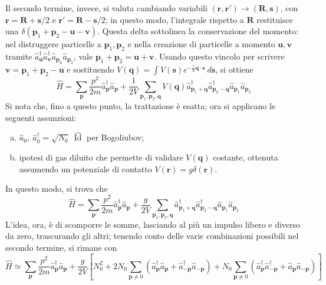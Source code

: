 \documentclass[11pt, a4paper]{scrartcl}
\theoremstyle{style}
\theoremstyle{style1}
\numberwithin{equation}{subsection}
\begin{document}
Il secondo termine, invece, si valuta cambiando variabili $(\mathbf{r} ,\mathbf{r} ') \to (\mathbf{R} ,\mathbf{s} )$, con $\mathbf{r} = \mathbf{R}  + \mathbf{s} /2$ e $\mathbf{r} ' = \mathbf{R} - \mathbf{s} /2$; in questo modo, l'integrale rispetto a $\mathbf{R} $ restituisce una $\delta \left(\mathbf{p} _1 + \mathbf{p} _2 - \mathbf{u} - \mathbf{v} \right) $.
Questa delta sottolinea la conservazione del momento: nel distruggere particelle a $\mathbf{p} _1, \mathbf{p} _2$ e nella creazione di particelle a momento $\mathbf{u} ,\mathbf{v} $ tramite $\hat{a}_\mathbf{u} ^\dagger \hat{a}^\dagger _\mathbf{v} \hat{a}_{\mathbf{p_1} } \hat{a}_{\mathbf{p} _2} $, vale $\mathbf{p} _1 +\mathbf{p} _2 = \mathbf{u} + \mathbf{v} $.
Usando questo vincolo per scrivere $\mathbf{v}  = \mathbf{p} _1 + \mathbf{p} _2 - \mathbf{u} $ e sostituendo $V(\mathbf{q} ) = \int V(\mathbf{s} ) e^{-\frac{i}{\hbar }\mathbf{q} \cdot \mathbf{s} } \ d\mathbf{s} $, si ottiene
\[
\hat{H} = \sum_{\mathbf{p} }^{} \frac{p^2}{2m} \hat{a}_\mathbf{p}^\dagger  \hat{a}_\mathbf{p} + \frac{1}{2V} \sum_{\mathbf{p} _1, \mathbf{p} _2, \mathbf{q} }^{} V(\mathbf{q} ) \hat{a}^\dagger _{\mathbf{p} _1 + \mathbf{q} } \hat{a}^\dagger _{\mathbf{p} _2 - \mathbf{q} }  \hat{a}_{\mathbf{p} _1} \hat{a}_{\mathbf{p} _2} 
\] 
Si nota che, fino a questo punto, la trattazione \`e esatta; ora si applicano le seguenti assunzioni:
\begin{enumerate}[(a).]
	\item $\hat{a}_0, \ \hat{a}_0^\dagger = \sqrt{N_0}\ \hat{\operatorname{Id} }$ per Bogoliubov;
	\item ipotesi di gas diluito che permette di validare $V(\mathbf{q} )$ costante, ottenuta assumendo un potenziale di contatto $V(\mathbf{r} ) = g \delta( \mathbf{r} )$.
\end{enumerate}
In questo modo, si trova che
\[
\hat{H}=\sum_{\mathbf{p} }^{}\frac{p^2}{2m} \hat{a}^\dagger _\mathbf{p} \hat{a}_\mathbf{p} +\frac{g}{2V}\sum_{\mathbf{p} _1,\mathbf{p} _2,\mathbf{q} }^{} \hat{a}^\dagger _{\mathbf{p} _1+ \mathbf{q} } \hat{a}^\dagger _{\mathbf{p} _2-\mathbf{q} } \hat{a}_{\mathbf{p}_1 } \hat{a}_{\mathbf{p} _2} 
\] 
L'idea, ora, \`e di scomporre le somme, lasciando al pi\`u un impulso libero e diverso da zero, trascurando gli altri; tenendo conto delle varie combinazioni possibili nel secondo termine, si rimane con
\[
	\hat{H}\simeq \sum_{\mathbf{p} }^{} \frac{p^2}{2m}\hat{a}_\mathbf{p} ^\dagger \hat{a}_\mathbf{p}  + \frac{g}{2V} \left[ N_0^2 + 2N_0 \sum_{\mathbf{p} \neq 0}^{} \left(\hat{a}^\dagger _{\mathbf{p} } \hat{a}_\mathbf{p} + \hat{a}^\dagger _{-\mathbf{p} } \hat{a}_{-\mathbf{p} }  \right)+N_0 \sum_{\mathbf{p} \neq 0}^{}\left(\hat{a}^\dagger _{\mathbf{p} } \hat{a}^\dagger _{-\mathbf{p} } + \hat{a}_\mathbf{p} \hat{a}_{-\mathbf{p} } \right)   \right] 
\] 
\end{document}
